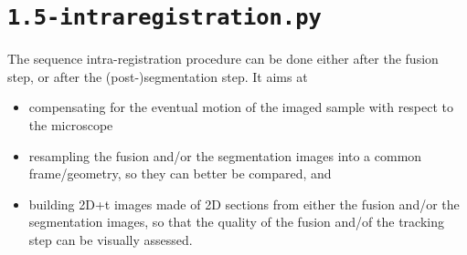 \section{\texttt{1.5-intraregistration.py}}
\label{sec:cli:intraregistration}

The sequence intra-registration procedure can be done either after the fusion step, or after the (post-)segmentation step. It aims at
\begin{itemize}
\itemsep -0.5ex
\item compensating for the eventual motion of the imaged sample with respect to the microscope
\item resampling the fusion and/or the segmentation images into a common frame/geometry, so they can better be compared, and
\item building 2D+t images made of 2D sections from either the  fusion
  and/or the segmentation images, so that the quality of the fusion
  and/of the tracking step can be visually assessed. 
\end{itemize}


